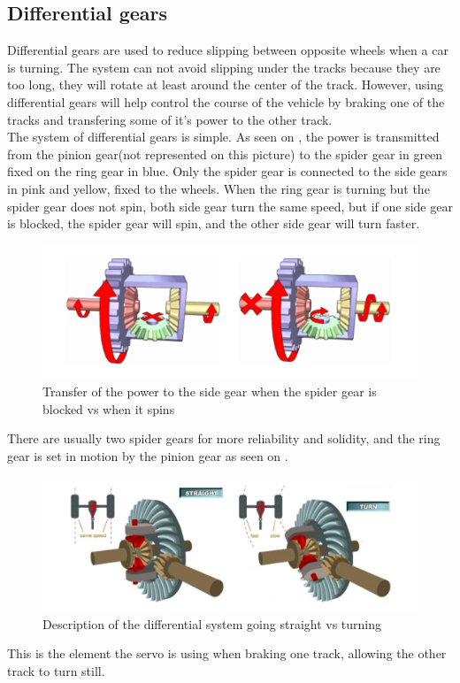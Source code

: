 \subsection{Differential gears}

Differential gears are used to reduce slipping between opposite wheels when a car is turning. The system can not avoid slipping under the tracks because they are too long, they will rotate at least around the center of the track. However, using differential gears will help control the course of the vehicle by braking one of the tracks and transfering some of it's power to the other track.\\

The system of differential gears is simple. As seen on , the power is transmitted from the pinion gear(not represented on this picture) to the spider gear in green fixed on the ring gear in blue. Only the spider gear is connected to the side gears in pink and yellow, fixed to the wheels.
When the ring gear is turning but the spider gear does not spin, both side gear turn the same speed, but if one side gear is blocked, the spider gear will spin,  and the other side gear will turn faster.\\

\begin{figure}[H]
	\centering
	\includegraphics[scale=0.13]{figures/diffGearLight}
	\caption{Transfer of the power to the side gear when the spider gear is blocked vs when it spins \cite{MechanicalEngineering}}
	\label{diffGearLight}
\end{figure}

There are usually two spider gears for more reliability and solidity, and the ring gear is set in motion by the pinion gear as seen on .\\

\begin{figure}[H]
	\centering
	\includegraphics[scale=0.14]{figures/diffGearFull}
	\caption{Description of the differential system going straight vs turning \cite{MechanicalEngineering}}
	\label{diffGearFull}
\end{figure}

This is the element the servo is using when braking one track, allowing the other track to turn still.\\